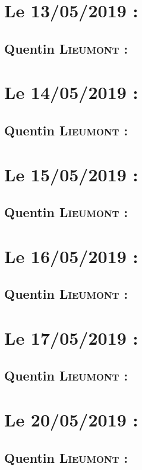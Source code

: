 \newpage
\section{Le 13/05/2019 :}
    \subsection{Quentin \textsc{Lieumont} :}
        
\newpage
\section{Le 14/05/2019 :}
    \subsection{Quentin \textsc{Lieumont} :}
        
\newpage
\section{Le 15/05/2019 :}
    \subsection{Quentin \textsc{Lieumont} :}
        
\newpage
\section{Le 16/05/2019 :}
    \subsection{Quentin \textsc{Lieumont} :}
        
\newpage
\section{Le 17/05/2019 :}
    \subsection{Quentin \textsc{Lieumont} :}
        
\newpage
\section{Le 20/05/2019 :}
    \subsection{Quentin \textsc{Lieumont} :}
        
